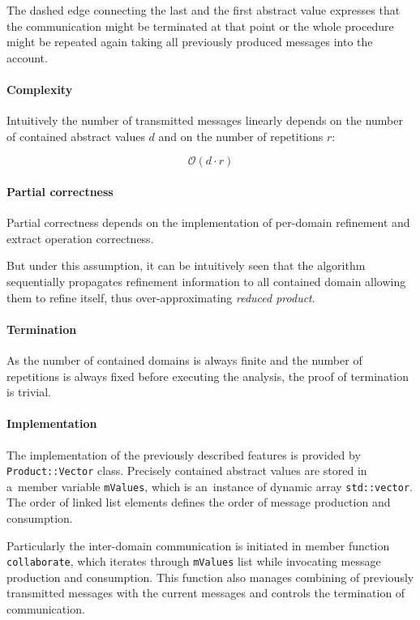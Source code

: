 \documentclass[12pt,oneside]{fithesis2}
\theoremstyle{definition}
\begin{document}
The dashed edge connecting the last and the first abstract value expresses that the communication might be terminated at that point or the whole procedure might be repeated again taking all previously produced messages into the account.

\paragraph{Complexity} Intuitively the number of transmitted messages linearly depends on the number of contained abstract values $d$ and on the number of repetitions $r$:

\[
\mathcal O(d \cdot r)
\]

\paragraph{Partial correctness}
Partial correctness depends on the implementation of per-domain refinement and extract operation correctness.

But under this assumption, it can be intuitively seen that the algorithm sequentially propagates refinement information to all contained domain allowing them to refine itself, thus over-approximating \textit{reduced product}.

\paragraph{Termination}
As the number of contained domains is always finite and the number of repetitions is always fixed before executing the analysis, the proof of termination is trivial.

\paragraph{Implementation} The implementation of the previously described features is provided by \texttt{Product::Vector} class. Precisely contained abstract values are stored in a~member variable \texttt{mValues}, which is an~instance of  dynamic array \texttt{std::vector}. The order of linked list elements defines the order of message production and consumption.

Particularly the inter-domain communication is initiated in member function \texttt{collaborate}, which iterates through \texttt{mValues} list while invocating message production and consumption. This function also manages combining of previously transmitted messages with the current messages and controls the termination of communication.
\end{document}
